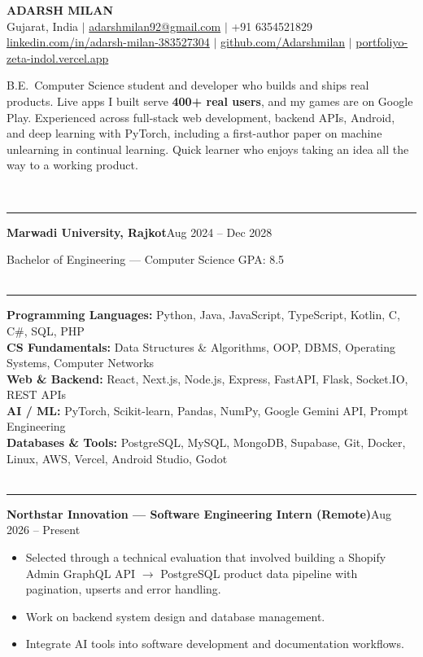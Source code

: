 \documentclass[10pt,a4paper]{article}
\renewcommand{\section}[1]{\vspace{6pt}{\large\bfseries\MakeUppercase{#1}}\\[-7pt]\rule{\textwidth}{0.6pt}\vspace{2pt}}
\newcommand{\entry}[2]{\par\textbf{#1}\hfill #2\par}
\newenvironment{points}{\vspace{-4pt}\begin{itemize}\setlength{\itemsep}{0pt}\setlength{\parskip}{0pt}\setlength{\topsep}{0pt}\setlength{\partopsep}{0pt}\setlength{\leftmargin}{12pt}}{\end{itemize}\vspace{-2pt}}
\newcommand{\sep}{\enspace$|$\enspace}
\begin{document}
\begin{center}
  {\Huge\bfseries ADARSH MILAN}\\[3pt]
  Gujarat, India \sep
  \href{mailto:adarshmilan92@gmail.com}{adarshmilan92@gmail.com} \sep
  +91 6354521829\\[1pt]
  \href{https://www.linkedin.com/in/adarsh-milan-383527304}{linkedin.com/in/adarsh-milan-383527304} \sep
  \href{https://github.com/Adarshmilan}{github.com/Adarshmilan} \sep
  \href{https://portfoliyo-zeta-indol.vercel.app/}{portfoliyo-zeta-indol.vercel.app}
\end{center}

B.E.\ Computer Science student and developer who builds and ships real products. Live apps I built serve
\textbf{400+ real users}, and my games are on Google Play. Experienced across full-stack web development, backend APIs,
Android, and deep learning with PyTorch, including a first-author paper on machine unlearning in continual learning.
Quick learner who enjoys taking an idea all the way to a working product.

\section{Education}
\entry{Marwadi University, Rajkot}{Aug 2024 -- Dec 2028}
Bachelor of Engineering --- Computer Science \hfill GPA: 8.5\\

\section{Skills}
\textbf{Programming Languages:} Python, Java, JavaScript, TypeScript, Kotlin, C, C\#, SQL, PHP\\
\textbf{CS Fundamentals:} Data Structures \& Algorithms, OOP, DBMS, Operating Systems, Computer Networks\\
\textbf{Web \& Backend:} React, Next.js, Node.js, Express, FastAPI, Flask, Socket.IO, REST APIs\\
\textbf{AI / ML:} PyTorch, Scikit-learn, Pandas, NumPy, Google Gemini API, Prompt Engineering\\
\textbf{Databases \& Tools:} PostgreSQL, MySQL, MongoDB, Supabase, Git, Docker, Linux, AWS, Vercel, Android Studio, Godot\\

\section{Experience}
\entry{Northstar Innovation --- Software Engineering Intern (Remote)}{Aug 2026 -- Present}
\begin{points}
  \item Selected through a technical evaluation that involved building a Shopify Admin GraphQL API $\rightarrow$ PostgreSQL product data pipeline with pagination, upserts and error handling.
  \item Work on backend system design and database management.
  \item Integrate AI tools into software development and documentation workflows.
\end{points}
\end{document}
